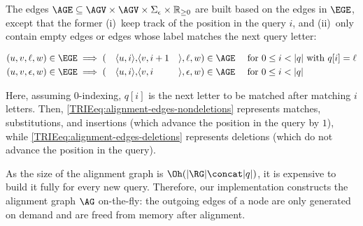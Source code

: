 \begin{samepage}
The edges $\AGE \subseteq \AGV \times \AGV \times \Sigma_\epsilon \times
\mathbb{R}_{\geq 0}$ are built based on the edges in $\EGE$, except that the
former (i)~keep track of the position in the query $i$, and (ii)~only contain
empty edges or edges
whose label matches the next query letter:

\vspace{-1.2em}
{%
\small
\begin{alignat}{10}
	(u,v,\ell,w) &\in \EGE \implies (&\langle u, i \rangle, &\langle v, i+1
		&&\rangle,\ell,w) \in \AGE \quad \text{ for } 0 \leq i < |q| \text{ with }
		q[i]=\ell \label{TRIEeq:alignment-edges-nondeletions} \\
	(u,v,\epsilon,w) &\in\EGE \implies (&\langle u, i \rangle, &\langle v, i
		&&\rangle,\epsilon,w) \in \AGE \quad \text{ for } 0 \leq i < |q| \label{TRIEeq:alignment-edges-deletions}
\end{alignat}
}%
\end{samepage}
%
Here, assuming $0$-indexing, $q[i]$ is the next letter to be matched after
matching $i$ letters. Then, \cref{TRIEeq:alignment-edges-nondeletions} represents
matches, substitutions, and insertions (which advance the position in the query
by $1$), while \cref{TRIEeq:alignment-edges-deletions} represents deletions (which do
not advance the position in the query).

As the size of the alignment graph is $\Oh(\lvert \RG \rvert \concat \lvert q
\rvert)$, it is expensive to build it fully for every new query.
Therefore, our implementation constructs the alignment graph $\AG$ on-the-fly:
the outgoing edges of a node are only generated on demand and are freed from
memory after alignment.